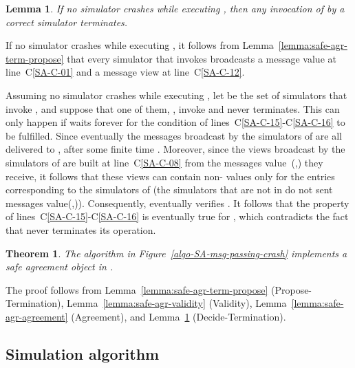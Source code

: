 \documentclass[11pt,letterpaper]{article}
\newtheorem{theorem}{Theorem}
\newtheorem{lemma}{Lemma}
\newlength {\afterproof}
\newcommand{\toto}{xxx}
\newenvironment{proofT}{\noindent{\bf Proof }}
{\hspace*{\fill}\par\vspace{\afterproof}}
\newenvironment{proofL}{\noindent{\bf Proof }}
{\hspace*{\fill}\par\vspace{\afterproof}}
\begin{document}
\begin{lemma}
\label{lemma:safe-agr-term-decide}
If no simulator crashes while executing  , then any
invocation of  by a correct simulator terminates.
\end{lemma}

\begin{proofL}
If no simulator crashes while executing  ,
it follows from Lemma~\ref{lemma:safe-agr-term-propose}
that every simulator  that invokes   broadcasts
a message  {\sc value}  at line~C\ref{SA-C-01} and
a message  {\sc view}  at line~C\ref{SA-C-12}.

Assuming no  simulator  crashes while executing  ,
let  be the set of simulators that invoke , and
suppose that one of them, , invoke  and never terminates.
This can only happen if  waits forever for the condition of
lines~C\ref{SA-C-15}-C\ref{SA-C-16} to be fulfilled.
Since eventually the messages broadcast by the
simulators of  are all delivered to , after some finite time
. Moreover, since
the views broadcast by the  simulators of  are built at
line~C\ref{SA-C-08} from the messages {\sc value}~(,)
they receive, it follows that these views can contain non- values
only for the entries corresponding to the simulators of  (the simulators
that are not in  do not sent  messages {\sc value}(,)).
Consequently,  eventually verifies .
It follows that the property of lines~C\ref{SA-C-15}-C\ref{SA-C-16} is
eventually true for , which contradicts the fact that 
never terminates its  operation.
\renewcommand{\toto}{lemma:safe-agr-term-decide}
\end{proofL}


\begin{theorem}
\label{theorem-safe-agreement}
The algorithm in Figure~{\em\ref{algo-SA-msg-passing-crash}}
implements a safe agreement object in .
\end{theorem}

\begin{proofT}
The proof follows from
Lemma~\ref{lemma:safe-agr-term-propose} (Propose-Termination),
Lemma~\ref{lemma:safe-agr-validity} (Validity),
Lemma~\ref{lemma:safe-agr-agreement} (Agreement),  and
Lemma~\ref{lemma:safe-agr-term-decide} (Decide-Termination).
\renewcommand{\toto}{theorem-safe-agreement}
\end{proofT}


\subsection{Simulation algorithm}
\end{document}
